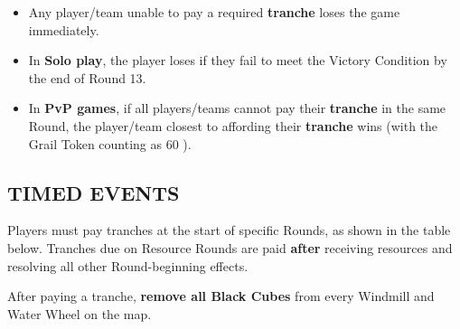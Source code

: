 \begin{multicols}{2}
\begin{itemize}  
  \item Any player/team unable to pay a required \textbf{tranche} loses the game immediately.  
  \item In \textbf{Solo play}, the player loses if they fail to meet the Victory Condition by the end of Round 13.  
  \item In \textbf{PvP games}, if all players/teams cannot pay their \textbf{tranche} in the same Round, the player/team closest to affording their \textbf{tranche} wins (with the Grail Token counting as 60 ).  
\end{itemize}  

\vfill

\subsection*{\MakeUppercase{Timed Events}}

Players must pay tranches at the start of specific Rounds, as shown in the table below. Tranches due on Resource Rounds are paid \textbf{after} receiving resources and resolving all other Round-beginning effects.  

After paying a tranche, \textbf{remove all Black Cubes} from every Windmill and Water Wheel on the map.  


\end{multicols}

